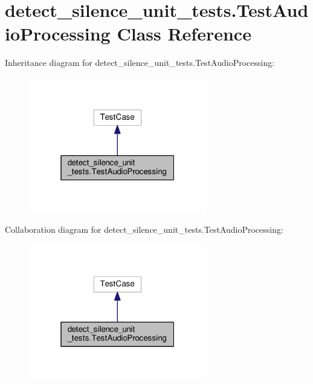 \hypertarget{classdetect__silence__unit__tests_1_1TestAudioProcessing}{\section{detect\-\_\-silence\-\_\-unit\-\_\-tests.\-Test\-Audio\-Processing Class Reference}
\label{classdetect__silence__unit__tests_1_1TestAudioProcessing}
}


Inheritance diagram for detect\-\_\-silence\-\_\-unit\-\_\-tests.\-Test\-Audio\-Processing\-:
\nopagebreak
\begin{figure}[H]
\begin{center}
\leavevmode
\includegraphics[width=220pt]{classdetect__silence__unit__tests_1_1TestAudioProcessing__inherit__graph}
\end{center}
\end{figure}


Collaboration diagram for detect\-\_\-silence\-\_\-unit\-\_\-tests.\-Test\-Audio\-Processing\-:
\nopagebreak
\begin{figure}[H]
\begin{center}
\leavevmode
\includegraphics[width=220pt]{classdetect__silence__unit__tests_1_1TestAudioProcessing__coll__graph}
\end{center}
\end{figure}
